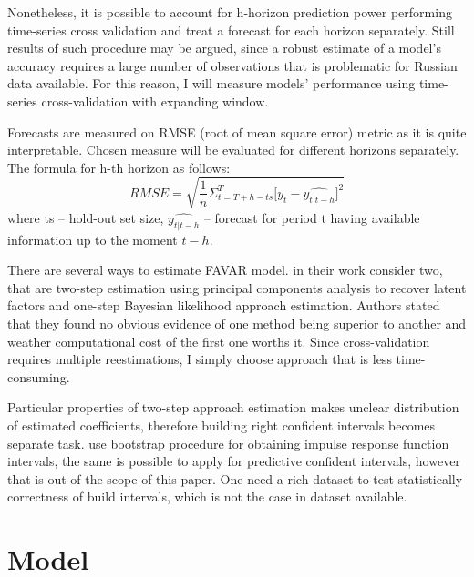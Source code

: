 \documentclass[a4paper, 14pt]{article}
\begin{document}
Nonetheless, it is possible to account for h-horizon prediction power performing time-series cross validation and treat a forecast for each horizon separately. Still results of such procedure may be argued, since a robust estimate of a model's accuracy requires a large number of observations that is problematic for Russian data available. For this reason, I will measure models' performance using time-series cross-validation with expanding window.

Forecasts are measured on RMSE (root of mean square error) metric
as it is quite interpretable. Chosen measure will be evaluated for different horizons separately. The formula for h-th horizon as follows:
\[
	RMSE = 
	\sqrt{
		\frac{1}{n}
		\Sigma_{t= T + h - ts}^{T}
			\Big[
			y_t - \widehat{y_{t|t-h}}
			\Big]^2}
\] where ts -- hold-out set size, $\widehat{y_{t|t-h}}$ -- forecast for period t having available information up to the moment $t-h$.


There are several ways to estimate FAVAR model. \cite{bernanke2005measuring} in their work consider two, that are two-step estimation using principal components analysis to recover latent factors and one-step Bayesian likelihood approach estimation. Authors stated that they found no obvious evidence of one method being superior to another and weather computational cost of the first one worths it. Since cross-validation requires multiple reestimations, I simply choose approach that is less time-consuming. 

Particular properties of two-step approach estimation makes unclear distribution of estimated coefficients, therefore building right confident intervals becomes separate task. \cite{bernanke2005measuring} use bootstrap procedure for obtaining impulse response function intervals, the same is possible to apply for predictive confident intervals, however that is out of the scope of this paper. One need a rich dataset to test statistically correctness of build intervals, which is not the case in dataset available.

\section{Model}
\end{document}

